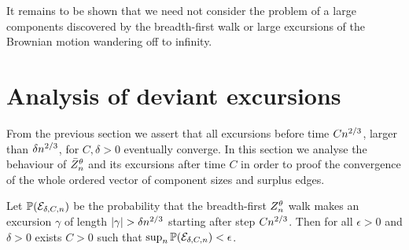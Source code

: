 
It remains to be shown that we need not consider the problem of a large components discovered by the breadth-first walk
or large excursions of the Brownian motion wandering off to infinity.

\section{Analysis of deviant excursions} \label{S: late excursions}
From the previous section we assert that all excursions before time $Cn^{2 / 3}$, larger than $\delta n^{2 / 3}$, for $C, \delta > 0$
eventually converge.
In this section we analyse the behaviour of $\bar{Z}^{\theta}_n$ and its excursions after time $C$ in order to proof the convergence
of the whole ordered vector of component sizes and surplus edges.

\begin{lemma} \label{L: late excursions}
	Let 
	$\mathbb{P}(\mathcal{E}_{\delta, C, n})$ 
	be the probability that the breadth-first $Z_n^{\theta}$ walk makes an excursion $\gamma$ of length 
	$|\gamma| > \delta n^{2 / 3}$ starting after step $Cn^{2 / 3}$.
	Then for all $\epsilon>0$ and $\delta > 0$ exists $C>0$ such that $\sup_n \mathbb{P}(\mathcal{E}_{\delta, C, n}) < \epsilon$. 
\end{lemma}


